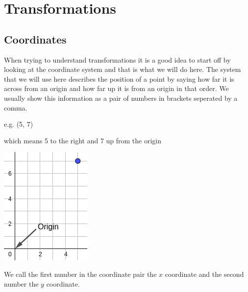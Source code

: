 \chapter{Transformations}
\section{Coordinates}
When trying to understand transformations it is a good idea to start off by looking at the coordinate system and that is what we will do here.  The system that we will use here describes the position of a point by saying how far it is across from an origin and how far up it is from an origin in that order.  We usually show this information as a pair of numbers in brackets seperated by a comma.

e.g. (5, 7)

which means 5 to the right and 7 up from the origin
\begin{center}
\includegraphics[scale=0.5]{./Images/Transformations/Basic_Coords.png}
\end{center}
We call the first number in the coordinate pair the $x$ coordinate and the second number the $y$ coordinate.

